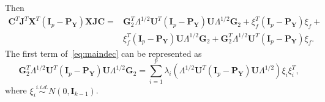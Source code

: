 \documentclass[12pt]{article} %
\newcommand{\bX}{\mathbf{X}}
\newcommand{\bP}{\mathbf{P}}
\newcommand{\bY}{\mathbf{Y}}
\newcommand{\bG}{\mathbf{G}}
\newcommand{\bJ}{\mathbf{J}}
\newcommand{\bC}{\mathbf{C}}
\newcommand{\bI}{\mathbf{I}}
\newcommand{\bU}{\mathbf{U}}
\theoremstyle{definition}
\begin{document}
Then 
\begin{equation}\label{eq:maindec}
\begin{aligned}
\bC^T\bJ^T \bX^T(\bI_p-\bP_{\bY}) \bX\bJ\bC
=&
\bG_2^T \Lambda^{1/2}\bU^T (\bI_p-\bP_{\bY})\bU\Lambda^{1/2}\bG_2+
\xi_f^T (\bI_p -\bP_{\bY})\xi_f+\\
&\xi_f^T (\bI_p -\bP_{\bY})\bU\Lambda^{1/2}\bG_2+
\bG_2^T \Lambda^{1/2}\bU^T (\bI_p-\bP_{\bY})\xi_f.
\end{aligned}
\end{equation}
    The first term of~\eqref{eq:maindec} can be represented as
\begin{equation}\label{eq:firstTerm}
\bG_2^T \Lambda^{1/2}\bU^T (\bI_p-\bP_{\bY})\bU\Lambda^{1/2}\bG_2=
\sum_{i=1}^p \lambda_i (\Lambda^{1/2}\bU^T (\bI_p-\bP_{\bY})\bU\Lambda^{1/2})\xi_i \xi_i^T,
\end{equation}
where $\xi_i\overset{i.i.d.}{\sim} N(0,\bI_{k-1})$.
\end{document}
